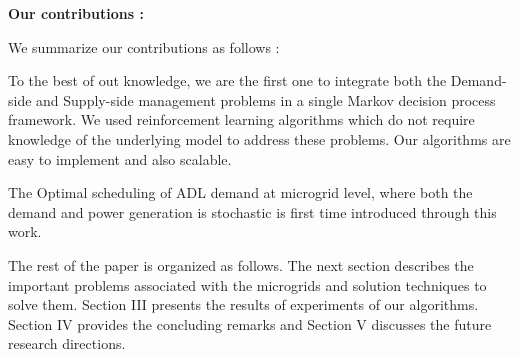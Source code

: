 
 

\textbf{Our contributions :}
\begin{inparaenum}[\bfseries (i)]
We summarize our contributions as follows :\\
\item To the best of out knowledge, we are the first one to integrate both the Demand-side and Supply-side management problems  in a single Markov decision process framework. We used reinforcement learning algorithms which do not require knowledge of the underlying model to address these problems. Our algorithms are easy to implement and also scalable.\\
\item The Optimal scheduling of ADL demand at microgrid level, where both the demand and power generation is stochastic is first time introduced through this work. \\    
\end{inparaenum}


The rest of the paper is organized as follows. The next section describes the important problems associated with the microgrids and solution techniques to solve them. Section III presents the results of experiments of our algorithms. Section IV provides the concluding remarks and Section V discusses the future research directions.